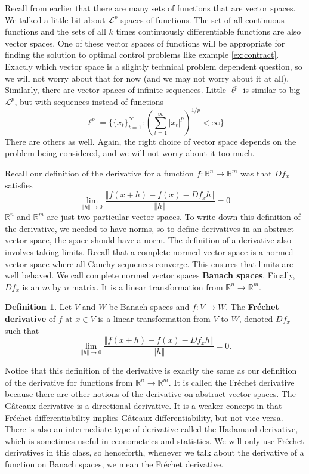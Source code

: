 \documentclass[12pt,reqno]{amsart}
\theoremstyle{definition}
\newtheorem{definition}{Definition}[section]
\def\R{\mathbb{R}}
\newcommand{\norm}[1]{\left\Vert {#1} \right\Vert}
\renewcommand{\to}{{\rightarrow}}
\begin{document}
Recall from earlier that there are many sets of functions that are
vector spaces. We talked a little bit about $\mathcal{L}^p$ spaces of
functions. The set of all continuous functions and the sets of all $k$
times continuously differentiable functions are also vector
spaces. One of these vector spaces of functions will be appropriate
for finding the solution to optimal control problems like
example \ref{ex:contract}. Exactly which vector space is a slightly
technical problem dependent question, so we will not worry about that
for now (and we may not worry about it at all). Similarly, there are
vector spaces of infinite sequences. Little $\ell^p$ is similar to big
$\mathcal{L}^p$, but with sequences instead of functions
\[ \ell^p = \{\{x_t\}_{t=1}^\infty:
\left(\sum_{t=1}^\infty |x_t|^p\right)^{1/p} < \infty\} \]
There are others as well. Again, the right choice of vector space
depends on the problem being considered, and we will not worry about
it too much. 

Recall our definition of the derivative for a function  $f:\R^n \to
\R^m$ was that $Df_x$ satisfies
\[ \lim_{\norm{h} \to 0} \frac{\norm{f(x+h) - f(x) - Df_x h}}{\norm{h}}
= 0 \]
 $\R^n$ and $\R^m$ are just two particular vector spaces. To write
down this definition of the derivative, we needed to have norms, so to
define derivatives in an abstract vector space, the space should have
a norm. The definition of a derivative also involves taking
limits. Recall that a complete normed vector space is a normed vector
space where all Cauchy sequences converge. This ensures that limits
are well behaved. We call complete normed vector spaces \textbf{Banach
  spaces}. Finally, $Df_x$ is an $m$ by $n$ matrix. It is a linear
transformation from $\R^n \to \R^m$.
\begin{definition}
  Let $V$ and $W$ be Banach spaces and $f:V \to W$. The
  \textbf{Fr\'{e}chet derivative} of $f$ at $x \in V$ is a linear
  transformation from $V$ to $W$, denoted $Df_x$ such that 
  \[ \lim_{\norm{h} \to 0} \frac{\norm{f(x+h) - f(x) - Df_x h
    }}{\norm{h}} = 0. \]
\end{definition}
Notice that this definition of the derivative is exactly the same as our
definition of the derivative for functions from $\R^n \to \R^m$. It is
called the Fr\'{e}chet derivative because there are other notions of
the derivative on abstract vector spaces. The G\^{a}teaux derivative
is a directional derivative. It is a weaker concept in that
Fr\'{e}chet differentiability implies G\^{a}teaux differentiability,
but not vice versa. There is also an intermediate type of derivative
called the Hadamard derivative, which is sometimes useful in
econometrics and statistics. We will only use Fr\'{e}chet derivatives
in this class, so henceforth, whenever we talk about the derivative of
a function on Banach spaces, we mean the Fr\'{e}chet derivative.  
\end{document}
